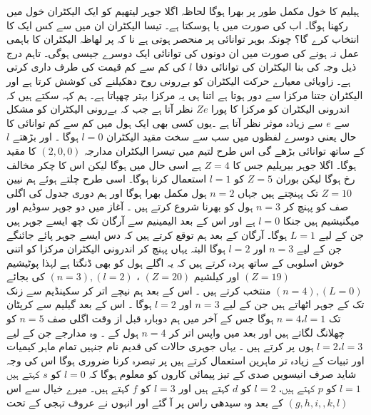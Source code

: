 ہیلیم کا  خول مکمل طور پر بھرا ہوگا لحاظہ اگلا جوہر لیتھیم  کو ایک الیکٹران  خول میں رکھنا ہوگا۔ اب  کی صورت میں  یا  ہوسکتا ہے۔ تیسا الیکٹران ان میں سے کس ایک کا انتخاب کرے گا؟ چونکہ بوہر توانائی  پر منحصر ہوتی ہے نا کہ  پر لھاظہ الیکٹران کا باہمی عمل نہ ہونے کی صورت میں ان دونوں کی توانائی ایک دوسرے جیسی ہوگی۔ تاہم درج ذیل وجہ کی بنا الیکٹران کی توانائی دفا
 \(l\) 
کی کم سے کم قیمت کی طرف داری کرتی ہے۔  زاویائی معیارے حرکت الیکٹران کو بےرونی روح دھکیلنے کی کوشش کرتا ہے اور الیکٹران جتنا مرکزا سے دور ہوتا ہے اتنا ہی یہ مرکزا بہتر چھپاتا ہے۔ ہم کہہ سکتے ہیں کہ اندرونی الیکٹران کو مرکزا کا پورا 
\(Ze\)
نظر آتا ہے جب کہ بےرونی الیکٹران کو مشکل سے 
\(e\)
 سے زیادہ موثر  نظر آتا ہے ۔یوں کسی بھی ایک ہول میں کم سے کم توانائی کا حال یعنی دوسرے لفظوں میں سب سے سخت مقید الیکٹران
 \( l=0\) 
 ہوگا ۔ اور بڑھتے
  \(l\) 
 کے ساتھ توانائی بڑھے گی اس طرح لتیم میں تیسرا الیکٹران مدارجہ
  \((2,0,0)\)
 کا مقید ہوگا۔ اگلا جوہر بیریلیم جس کا
  \(Z=4\) 
 ہے اسی حال میں ہوگا لیکن اس کا چکر مخالف رخ ہوگا لیکن بوران
  \(Z=5\) 
 کو
 \( l=1\) 
 استعمال کرنا ہوگا۔ 
 اسی طرح چلتے ہوئے ہم  نیین
 \( Z=10\) 
 تک پہنچتے ہیں جہاں
  \(n=2\) 
 ہول مکمل بھرا ہوگا اور ہم دوری جدول کی اگلی صف کو پہنچ کر
  \(n= 3\) 
 ہول کو بھرنا شروع کرتے ہیں ۔ آغاز میں دو جوہر سوڈیم اور میگنیشیم ہیں جنکا
 \( l=0\) 
 ہے اور اس کے بعد الیمینیم سے آرگان تک چھ ایسے جوہر ہیں جن کے لیے 
 \(L=1\)
  ہوگا۔ آرگان کے بعد ہم توقع کرتے ہیں کہ دس ایسے جوہر پائے جائنگے جن کے لیے 
  \(n=3\) 
  اور 
  \(l=2\) 
  ہوگا البتہ یہاں پہنچ کر اندرونی الیکٹران مرکزا کو اتنی خوش اسلوبی کے ساتھ پردہ کرتے ہیں کہ یہ اگلے ہول کو بھی ڈنگتا ہے لہذا پوٹیشیم
\(( Z=19)\) 
  اور کیلشیم
  \((Z=20)\)
  ،
  \((n=3),(l=2)\)
 کی بجائے
 \( (n=4),( L=0 )\)
 منتخب کرتے ہیں  ۔ اس کے بعد ہم نیچے اتر کر سکینڈیم سے زنک تک کے جوہر اٹھاتے ہیں جن کے لیے
 \( n=3\)
  اور
\( l=2\)
   ہوگا ۔ اس کے بعد گیلیم سے کرپٹان تک
\( n=4، l=1\)
    ہوگا جس کے آخر میں ہم دوبارہ قبل از وقت اگلی صف
\( n=5\) 
    کو چھلانگ لگاتے ہیں اور بعد میں واپس اتر کر
\( n= 4\)  
    ہول کے ۔ وہ مدارجے جن کے لیے
\( l=2، l=3\) 
    ہوں پر کرتے ہیں ۔ یہاں جوہری حالات کی قدیم نام جنہیں تمام ماہر کیمیات اور تبیات کے زیادہ تر ماہرین استعمال کرتے ہیں پر تبصرہ کرنا ضروری ہوگا اس کی وجہ شاید صرف انیسویں صدی کے تیز پیمائی کاروں کو معلوم ہوگا کہ
 \(l=0\) 
    کو
  \(s\)
      کہتے ہیں 
 \(l=1\)
       کو 
 \(p\)
        کہتے ہیں،
\( l=2\) 
        کو
   \(d\)
          کہتے ہیں اور
   \(l=3\)
            کو
\( f\)
  کہتے ہیں۔ میرے خیال سے اس کے بعد وہ سیدھی راس پر آ گئے اور انہوں نے عروف تہجی کے تحت
\( (g,h,i,,k,l)\)
